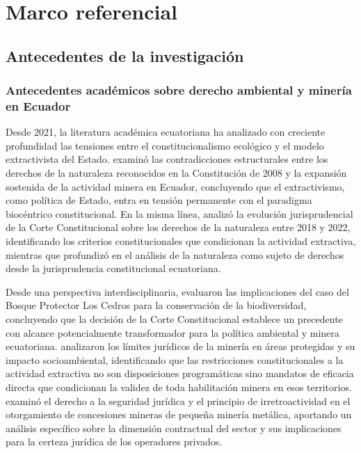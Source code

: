 
\chapter{Marco referencial}

\section{Antecedentes de la investigación}

\subsection{Antecedentes académicos sobre derecho ambiental y minería en Ecuador}

Desde 2021, la literatura académica ecuatoriana ha analizado con creciente profundidad las tensiones entre el constitucionalismo ecológico y el modelo extractivista del Estado. \textcite{grefa_valencia_2021} examinó las contradicciones estructurales entre los derechos de la naturaleza reconocidos en la Constitución de 2008 y la expansión sostenida de la actividad minera en Ecuador, concluyendo que el extractivismo, como política de Estado, entra en tensión permanente con el paradigma biocéntrico constitucional. En la misma línea, \textcite{lozano_espinosa_2023} analizó la evolución jurisprudencial de la Corte Constitucional sobre los derechos de la naturaleza entre 2018 y 2022, identificando los criterios constitucionales que condicionan la actividad extractiva, mientras que \textcite{ochoa_jimenez_2024} profundizó en el análisis de la naturaleza como sujeto de derechos desde la jurisprudencia constitucional ecuatoriana.

Desde una perspectiva interdisciplinaria, \textcite{peck_et_al_2024} evaluaron las implicaciones del caso del Bosque Protector Los Cedros para la conservación de la biodiversidad, concluyendo que la decisión de la Corte Constitucional establece un precedente con alcance potencialmente transformador para la política ambiental y minera ecuatoriana. \textcite{sanchez_romero_et_al_2026} analizaron los límites jurídicos de la minería en áreas protegidas y su impacto socioambiental, identificando que las restricciones constitucionales a la actividad extractiva no son disposiciones programáticas sino mandatos de eficacia directa que condicionan la validez de toda habilitación minera en esos territorios. \textcite{villacis_calvas_2022} examinó el derecho a la seguridad jurídica y el principio de irretroactividad en el otorgamiento de concesiones mineras de pequeña minería metálica, aportando un análisis específico sobre la dimensión contractual del sector y sus implicaciones para la certeza jurídica de los operadores privados.

